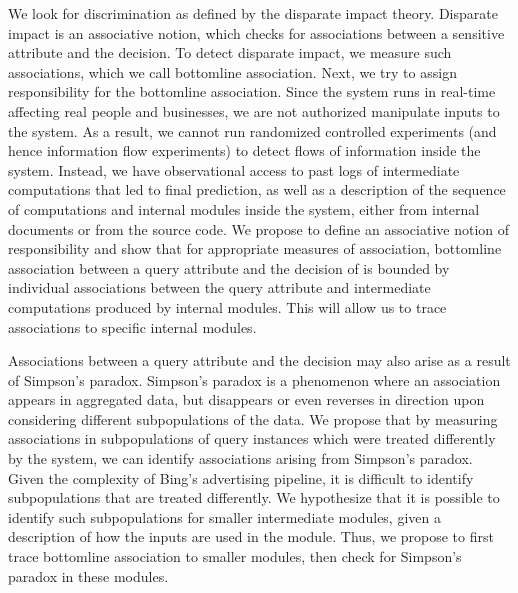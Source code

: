 \documentclass[10pt, onecolumn]{report}
\begin{document}
We look for discrimination as defined by the disparate impact theory. Disparate impact
is an associative notion, which checks for associations between a sensitive attribute
and the decision. To detect disparate impact, we measure such associations, which we call
bottomline association. Next, we try to assign responsibility for the bottomline association.
Since the system runs in real-time affecting real people and businesses, we 
are not authorized manipulate inputs to the system. As a result, we cannot run randomized 
controlled experiments (and hence information flow experiments) to detect
flows of information inside the system. Instead, we have observational access to past logs
of intermediate computations that led to final prediction, as well as
a description of the sequence of computations and internal 
modules inside the system, either from internal documents or from the source code. 
We propose to define an associative notion of responsibility and show 
that for appropriate measures of association, 
bottomline association between a query attribute and the decision of 
is bounded by individual associations between the query attribute
and intermediate computations produced by internal modules. 
This will allow us to trace associations to specific internal modules. 

Associations between a query attribute and the decision may also arise
as a result of Simpson's paradox. Simpson's paradox is a phenomenon 
where an association appears in aggregated data, but disappears 
or even reverses in direction upon considering different subpopulations of the data.
We propose that by measuring associations in 
subpopulations of query instances which were treated differently by the system, 
we can identify associations arising from Simpson's paradox. 
Given the complexity of Bing's advertising pipeline, it is difficult to identify
subpopulations that are treated differently. We hypothesize that it is possible to identify 
such subpopulations for smaller intermediate modules, given a 
description of how the inputs are used in the module. Thus, we propose to first 
trace bottomline association to smaller modules, then check for Simpson's
paradox in these modules.
\end{document}
